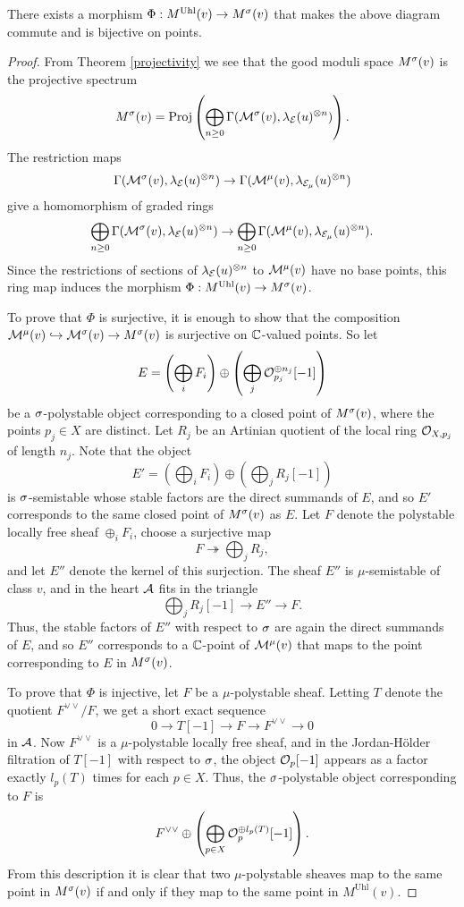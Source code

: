 \begin{thm}\label{uhlenbeck}
    There exists a morphism $\Phi: M^{\mathrm{Uhl}}(v) \to M^\sigma(v)$ that makes the above diagram commute and is bijective on points.
\end{thm}
\begin{proof}
    From Theorem \ref{projectivity} we see that the good moduli space $M^\sigma(v)$ is the projective spectrum
    \[ M^{\sigma}(v) = \operatorname{\mathrm{Proj}} \left(\bigoplus_{n \ge 0} \Gamma(\mathcal{M}^{\sigma}(v), \lambda_{\mathcal{E}}(u)^{\otimes n}) \right). \]
    The restriction maps
    \[ \Gamma(\mathcal{M}^{\sigma}(v), \lambda_{\mathcal{E}}(u)^{\otimes n}) \to \Gamma(\mathcal{M}^\mu(v), \lambda_{\mathcal{E}_\mu}(u)^{\otimes n}) \]
    give a homomorphism of graded rings
    \[ \bigoplus_{n \ge 0} \Gamma(\mathcal{M}^{\sigma}(v), \lambda_{\mathcal{E}}(u)^{\otimes n}) \to \bigoplus_{n \ge 0} \Gamma(\mathcal{M}^\mu(v), \lambda_{\mathcal{E}_\mu}(u)^{\otimes n}). \]
    Since the restrictions of sections of $\lambda_{\mathcal{E}}(u)^{\otimes n}$ to $\mathcal{M}^\mu(v)$ have no base points, this ring map induces the morphism $\Phi: M^{\mathrm{Uhl}}(v) \to M^\sigma(v)$. 
    
    To prove that $\Phi$ is surjective, it is enough to show that the composition $\mathcal{M}^\mu(v) \hookrightarrow \mathcal{M}^{\sigma}(v) \to M^\sigma(v)$ is surjective on $\mathbb{C}$-valued points. So let 
    \[ E = \left(\bigoplus_i F_i\right) \oplus \left(\bigoplus_j \mathcal{O}_{p_j}^{\oplus n_j}[-1]\right) \]
    be a $\sigma$-polystable object corresponding to a closed point of $M^\sigma(v)$, where the points $p_j \in X$ are distinct. Let $R_j$ be an Artinian quotient of the local ring $\mathcal{O}_{X, p_j}$ of length $n_j$. Note that the object
    \[ E' = \left(\bigoplus_i F_i\right) \oplus \left(\bigoplus_j R_j [-1]\right) \]
    is $\sigma$-semistable whose stable factors are the direct summands of $E$, and so $E'$ corresponds to the same closed point of $M^\sigma(v)$ as $E$. Let $F$ denote the polystable locally free sheaf $\oplus_i F_i$, choose a surjective map
    \[ F \twoheadrightarrow \bigoplus_j R_j, \]
    and let $E''$ denote the kernel of this surjection. The sheaf $E''$ is $\mu$-semistable of class $v$, and in the heart $\mathcal{A}$ fits in the triangle
    \[ \bigoplus_j R_j[-1] \to E'' \to F. \]
    Thus, the stable factors of $E''$ with respect to $\sigma$ are again the direct summands of $E$, and so $E''$ corresponds to a $\mathbb{C}$-point of $\mathcal{M}^\mu(v)$ that maps to the point corresponding to $E$ in $M^\sigma(v)$.
    
    To prove that $\Phi$ is injective, let $F$ be a $\mu$-polystable sheaf. Letting $T$ denote the quotient $F^{\vee\vee}/F$, we get a short exact sequence
    \[ 0 \to T[-1] \to F \to F^{\vee\vee} \to 0 \]
    in $\mathcal{A}$. Now $F^{\vee\vee}$ is a $\mu$-polystable locally free sheaf, and in the Jordan-H\"older filtration of $T[-1]$ with respect to $\sigma$, the object $\mathcal{O}_p[-1]$ appears as a factor exactly $l_p(T)$ times for each $p \in X$. Thus, the $\sigma$-polystable object corresponding to $F$ is
    \[ F^{\vee\vee} \oplus \left(\bigoplus_{p \in X} \mathcal{O}_p^{\oplus l_p(T)}[-1] \right). \]
    From this description it is clear that two $\mu$-polystable sheaves map to the same point in $M^\sigma(v)$ if and only if they map to the same point in $M^{\mathrm{Uhl}}(v)$.
\end{proof} 